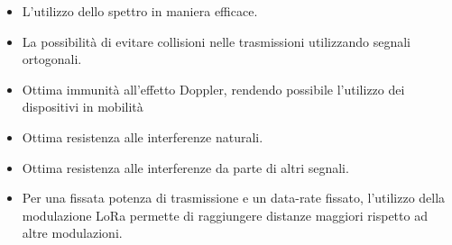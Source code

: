 \begin{itemize}
        \item   L'utilizzo dello spettro in maniera efficace. 
        \item   La possibilità di evitare collisioni nelle trasmissioni
                utilizzando segnali ortogonali.
        \item   Ottima immunità all'effetto Doppler, rendendo possibile
                l'utilizzo dei dispositivi in mobilità
        \item   Ottima resistenza alle interferenze naturali.  
        \item   Ottima resistenza alle interferenze da parte di altri segnali.
        \item   Per una fissata potenza di trasmissione e un data-rate fissato,
                l'utilizzo della modulazione LoRa permette di raggiungere
                distanze maggiori rispetto ad altre modulazioni.
\end{itemize}

